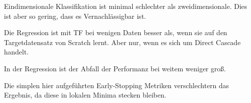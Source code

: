 Eindimensionale Klassifikation ist minimal schlechter als zweidimensionale. Dies ist aber so gering, dass es Vernachlässigbar ist. \newline


Die Regression ist mit TF bei wenigen Daten besser als, wenn sie auf den Targetdatensatz von Scratch lernt. 
Aber nur, wenn es sich um Direct Cascade handelt. 


In der Regression ist der Abfall der Performanz bei weitem weniger groß. %

Die simplen hier aufgeführten Early-Stopping Metriken verschlechtern das Ergebnis, da diese in lokalen Minima stecken bleiben. 
